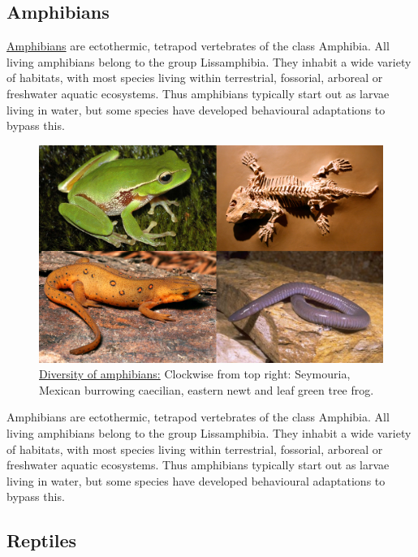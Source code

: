 \hypertarget{amphibians}{%
\subsection{Amphibians}\label{amphibians}}

\href{https://en.wikipedia.org/wiki/Amphibian}{Amphibians} are ectothermic, tetrapod vertebrates of the class Amphibia. All living amphibians belong to the group Lissamphibia. They inhabit a wide variety of habitats, with most species living within terrestrial, fossorial, arboreal or freshwater aquatic ecosystems. Thus amphibians typically start out as larvae living in water, but some species have developed behavioural adaptations to bypass this.



\begin{figure}

{\centering \includegraphics[width=0.7\linewidth]{./figures/animals/Amphibians} 

}

\caption{\href{https://commons.wikimedia.org/wiki/File:Amphibians.png}{Diversity of amphibians:} Clockwise from top right: Seymouria, Mexican burrowing caecilian, eastern newt and leaf green tree frog.}\label{fig:amphibiandiversity}
\end{figure}

Amphibians are ectothermic, tetrapod vertebrates of the class Amphibia. All living amphibians belong to the group Lissamphibia. They inhabit a wide variety of habitats, with most species living within terrestrial, fossorial, arboreal or freshwater aquatic ecosystems. Thus amphibians typically start out as larvae living in water, but some species have developed behavioural adaptations to bypass this.

\hypertarget{reptiles}{%
\subsection{Reptiles}\label{reptiles}}

